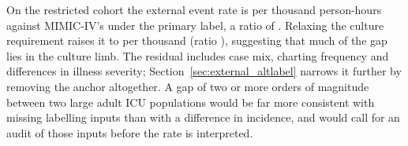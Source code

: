 \begin{table}[H]
    \centering\small
    \caption{Event-rate reconciliation for the development cohort and both
    external anchors. The antibiotic-only anchor is not Sepsis-3 and its rate
    is not interchangeable with the other two.}
    \label{tab:external_rates}
\end{table}

On the restricted cohort the external event rate is \pcExtRateEicuB{} per
thousand person-hours against MIMIC-IV's \pcExtRateMimicB{} under the primary
label, a ratio of \pcExtRateRatioB. Relaxing the culture requirement raises it
to \pcExtRateEicuAbxB{} per thousand (ratio \pcExtRateRatioAbxB), suggesting
that much of the gap lies in the culture limb. The residual includes case mix,
charting frequency and differences in illness severity;
Section~\ref{sec:external_altlabel} narrows it further by removing the anchor
altogether. A gap of two or more orders of magnitude between two large adult
ICU populations would be far more consistent with missing labelling inputs
than with a difference in incidence, and would call for an audit of those
inputs before the rate is interpreted.

